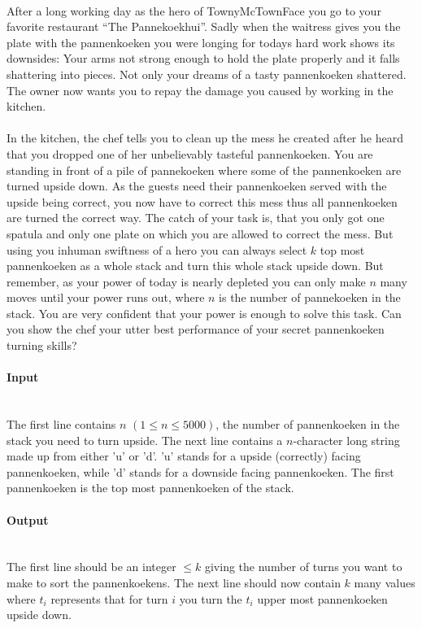 



\makeheader \ \\
After a long working day as the hero of TownyMcTownFace you go to your favorite restaurant ``The Pannekoekhui''. Sadly when the waitress gives you the plate with the pannenkoeken you were longing for todays hard work shows its downsides: Your arms not strong enough to hold the plate properly and it falls shattering into pieces. Not only your dreams of a tasty pannenkoeken shattered. The owner now wants you to repay the damage you caused by working in the kitchen. \\ \ \\
In the kitchen, the chef tells you to clean up the mess he created after he heard that you dropped one of her unbelievably tasteful pannenkoeken. You are standing in front of a pile of pannekoeken where some of the pannenkoeken are turned upside down. As the guests need their pannenkoeken served with the upside being correct, you now have to correct this mess thus all pannenkoeken are turned the correct way. The catch of your task is, that you only got one spatula and only one plate on which you are allowed to correct the mess. But using you inhuman swiftness of a hero you can always select $k$ top most pannenkoeken as a whole stack and turn this whole stack upside down. But remember, as your power of today is nearly depleted you can only make $n$ many moves until your power runs out, where $n$ is the number of pannekoeken in the stack. You are very confident that your power is enough to solve this task. Can you show the chef your utter best performance of your secret pannenkoeken turning skills?


\paragraph*{Input}\ \\
The first line contains $n$ $(1 \leq n \leq  5000)$, the number of pannenkoeken in the stack you need to turn upside. The next line contains a $n$-character long string made up from either 'u' or 'd'. 'u' stands for a upside (correctly) facing pannenkoeken, while 'd' stands for a downside facing pannenkoeken. The first pannenkoeken is the top most pannenkoeken of the stack.

\paragraph*{Output}\ \\
The first line should be an integer $\leq k$ giving the number of turns you want to make to sort the pannenkoekens. The next line should now contain $k$ many values where $t_i$ represents that for turn $i$ you turn the $t_i$ upper most pannenkoeken upside down.
\begin{samples}
\end{samples}

